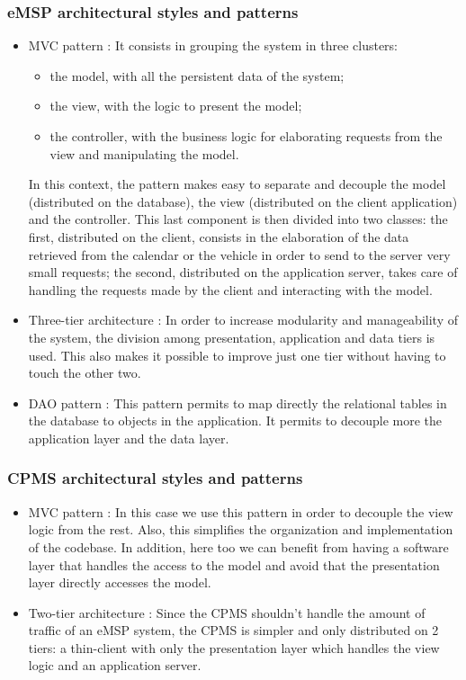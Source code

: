 \subsubsection{\ac{eMSP} architectural styles and patterns}
\begin{itemize}
    \item \acl{MVC} pattern \cite{ref:MVC-pattern}: It consists in grouping the system in three clusters:
          \begin{itemize}
              \item the model, with all the persistent data of the system;
              \item the view, with the logic to present the model;
              \item the controller, with the business logic for elaborating requests from the view and manipulating the model.
          \end{itemize}
          In this context, the pattern makes easy to separate and decouple the model (distributed on the database), the view (distributed on the client application) and the controller.
          This last component is then divided into two classes:
          the first, distributed on the client, consists in the elaboration of the data retrieved from the calendar or the vehicle in order to send to the server very small requests;
          the second, distributed on the application server, takes care of handling the requests made by the client and interacting with the model.
    \item Three-tier architecture \cite{ref:multitier-pattern}: In order to increase modularity and manageability of the system, the division among presentation, application and data tiers is used. This also makes it possible to improve just one tier without having to touch the other two.
    \item \ac{DAO} pattern \cite{ref:dao-pattern}: This pattern permits to map directly the relational tables in the database to objects in the application. It permits to decouple more the application layer and the data layer.
\end{itemize}

\subsubsection{\ac{CPMS} architectural styles and patterns}
\begin{itemize}
    \item \acl{MVC} pattern \cite{ref:MVC-pattern}: In this case we use this pattern in order to decouple the view logic from the rest. Also, this simplifies the organization and implementation of the codebase. In addition, here too we can benefit from having a software layer that handles the access to the model and avoid that the presentation layer directly accesses the model.
    \item Two-tier architecture \cite{ref:multitier-pattern}: Since the \ac{CPMS} shouldn't handle the amount of traffic of an \ac{eMSP} system, the \ac{CPMS} is simpler and only distributed on 2 tiers: a thin-client with only the presentation layer which handles the view logic and an application server.
\end{itemize}


